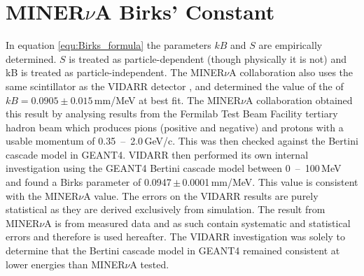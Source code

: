 \section{MINER$\nu$A Birks' Constant}\label{sec:GEANT4Simulation_MINERvABirksConstant}
In equation \ref{equ:Birks_formula} the parameters $kB$ and $S$ are empirically determined. $S$ is treated as particle-dependent (though physically it is not) and kB is treated as particle-independent. The MINER$\nu$A collaboration \cite{aliaga_2015} also uses the same scintillator as the VIDARR detector \cite{aliaga_2014}, and determined the value of the of $kB = 0.0905 \pm 0.015$\,mm/MeV at best fit. The MINER$\nu$A collaboration obtained this result by analysing results from the Fermilab Test Beam Facility tertiary hadron beam which produces pions (positive and negative) and protons with a usable momentum of 0.35~--~2.0\,GeV/c. This was then checked against the Bertini cascade model in GEANT4. VIDARR then performed its own internal investigation using the GEANT4 Bertini cascade model between 0~--~100\,MeV and found a Birks parameter of 0.0947\,$\pm$\,0.0001\,mm/MeV. This value is consistent with the MINER$\nu$A value. The errors on the VIDARR results are purely statistical as they are derived exclusively from simulation. The result from MINER$\nu$A is from measured data and as such contain systematic and statistical errors and therefore is used hereafter. The VIDARR investigation was solely to determine that the Bertini cascade model in GEANT4 remained consistent at lower energies than MINER$\nu$A tested. %

